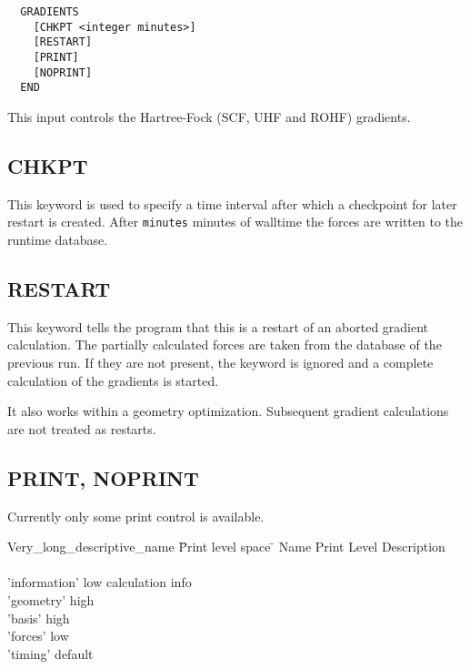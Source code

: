 \begin{verbatim}
  GRADIENTS 
    [CHKPT <integer minutes>]
    [RESTART]
    [PRINT]
    [NOPRINT]
  END
\end{verbatim}

  This input controls the Hartree-Fock (SCF, UHF and ROHF) gradients.  

\subsection{CHKPT}

  This keyword is used to specify a time interval after which a
  checkpoint for later restart is created. After \verb+minutes+
  minutes of walltime the forces are written to the runtime database.

\subsection{RESTART}

  This keyword tells the program that this is a restart of an aborted
  gradient calculation. The partially calculated forces are taken from
  the database of the previous run. If they are not present, the
  keyword is ignored and a complete calculation of the gradients is started.

  It also works within a geometry optimization. Subsequent gradient 
  calculations are not treated as restarts.

\subsection{PRINT, NOPRINT}

  Currently only some print control is available.

\begin{tabbing}
  Very\_long\_descriptive\_name \= Print level space \= \kill
  Name                   \> Print Level \> Description \\
                         \>        \> \\
        'information'   \>        low  \> calculation info\\
        'geometry'    \>          high \> \\
        'basis'        \>         high \> \\
        'forces'   \>             low \> \\
        'timing'   \>             default \> 
\end{tabbing}
